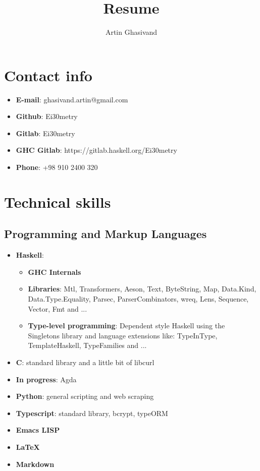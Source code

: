 \documentclass{article}
\renewcommand{\maketitle}{
    \begin{center}
        \huge{\theauthor}

    \vspace{.25em}

    \end{center}
}
\begin{document}
\title{Resume}
\author{Artin Ghasivand}
\maketitle

\section{Contact info}
\begin{itemize}
    \item \textbf{E-mail}: ghasivand.artin@gmail.com
    \item \textbf{Github}: Ei30metry
    \item \textbf{Gitlab}: Ei30metry
    \item \textbf{GHC Gitlab}: https://gitlab.haskell.org/Ei30metry
    \item \textbf{Phone}: +98 910 2400 320

\end{itemize}


\section{Technical skills}

\subsection{Programming and Markup Languages}

\begin{itemize}

    \item \textbf{Haskell}:
       \begin{itemize}

       \item \textbf{GHC Internals}
       \item \textbf{Libraries}: Mtl, Transformers, Aeson, Text, ByteString, Map, Data.Kind, Data.Type.Equality, Parsec, ParserCombinators, wreq, Lens, Sequence, Vector, Fmt and ...
       \item  \textbf{Type-level programming}: Dependent style Haskell using the Singletons library and language extensions like: TypeInType, TemplateHaskell, TypeFamilies and ...
           
       \end{itemize}

    \item \textbf{C}: standard library and a little bit of libcurl
    \item \textbf{In progress}: Agda
    \item \textbf{Python}: general scripting and web scraping
    \item \textbf{Typescript}: standard library, bcrypt, typeORM
    \item \textbf{Emacs LISP}
    \item \textbf{\LaTeX}
    \item \textbf{Markdown}

\end{itemize}
\end{document}
